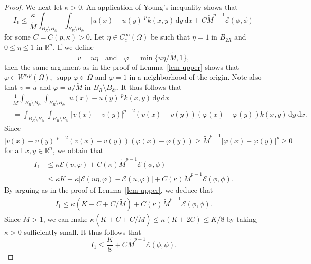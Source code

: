 \documentclass[11pt]{amsart}
\theoremstyle{plain}
\theoremstyle{definition}
\numberwithin{equation}{section}
\DeclareMathOperator{\supp}{supp}
\begin{document}
\begin{proof}
We next let $\kappa > 0$. An application of Young's inequality shows that
\begin{equation*}
I_1 \leq \frac{\kappa}{\widetilde{M}} \int_{B_{R} \setminus B_{\delta r}} \int_{B_{R} \setminus B_{\delta r}} |u(x)-u(y)|^p k(x, y) \,\mathrm{d}y\,\mathrm{d}x + C \widetilde{M}^{p-1} \mathcal{E}(\phi, \phi)
\end{equation*}
for some $C=C(p, \kappa)>0$. Let $\eta \in C^\infty_c(\Omega)$ be such that $\eta = 1$ in $B_{2R}$ and $0 \leq \eta \leq 1$ in $\mathbb{R}^n$. If we define
\begin{equation*}
v=u\eta \quad\text{and}\quad \varphi=\min\{u\eta/\widetilde{M}, 1 \},
\end{equation*}
then the same argument as in the proof of Lemma~\ref{lem-upper} shows that $\varphi \in W^{s, p}(\Omega)$, $\supp \varphi \Subset \Omega$ and $\varphi = 1$ in a neighborhood of the origin. Note also that $v=u$ and $\varphi=u/\widetilde{M}$ in $B_R \setminus B_{\delta r}$. It thus follows that
\begin{align*}
&\frac{1}{\widetilde{M}} \int_{B_{R} \setminus B_{\delta r}} \int_{B_{R} \setminus B_{\delta r}} |u(x)-u(y)|^p k(x, y) \,\mathrm{d}y\,\mathrm{d}x \\
&=\int_{B_{R} \setminus B_{\delta r}} \int_{B_{R} \setminus B_{\delta r}} |v(x)-v(y)|^{p-2}(v(x)-v(y))(\varphi(x)-\varphi(y)) k(x, y) \,\mathrm{d}y\,\mathrm{d}x.
\end{align*}
Since $|v(x)-v(y)|^{p-2}(v(x)-v(y))(\varphi(x)-\varphi(y)) \geq \widetilde{M}^{p-1}|\varphi(x)-\varphi(y)|^p \geq 0$ for all $x, y \in \mathbb{R}^n$, we obtain that
\begin{align*}
I_1
&\leq \kappa \mathcal{E}(v, \varphi) + C(\kappa) \widetilde{M}^{p-1} \mathcal{E}(\phi, \phi) \\
&\leq \kappa K + \kappa |\mathcal{E}(u\eta, \varphi) - \mathcal{E}(u, \varphi)| + C(\kappa) \widetilde{M}^{p-1} \mathcal{E}(\phi, \phi).
\end{align*}
By arguing as in the proof of Lemma~\ref{lem-upper}, we deduce that
\begin{align*}
I_1 \leq \kappa \left( K + C + C/\widetilde{M} \right) + C(\kappa) \widetilde{M}^{p-1} \mathcal{E}(\phi, \phi).
\end{align*}
Since $\widetilde{M}>1$, we can make $\kappa (K+C+C/\widetilde{M}) \leq \kappa (K+2C) \leq K/8$ by taking $\kappa>0$ sufficiently small. It thus follows that
\begin{equation*}
I_1 \leq \frac{K}{8} + C\widetilde{M}^{p-1} \mathcal{E}(\phi, \phi).

\end{equation*}
\end{proof}
\end{document}
